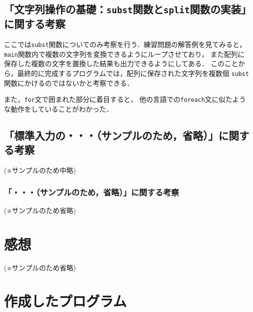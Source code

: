 \subsection{「文字列操作の基礎：\texttt{subst}関数と\texttt{split}関数の実装」に関する考察}

ここでは\verb|subst|関数についてのみ考察を行う．練習問題の解答例を見てみると，
\verb|main|関数内で複数の文字列を変換できるようにループさせており，
また配列に保存した複数の文字を置換した結果も出力できるようにしてある．
このことから，最終的に完成するプログラムでは，配列に保存された文字列を複数個
\verb|subst|関数にかけるのではないかと考察できる．

また，\verb|for|文で囲まれた部分に着目すると，
他の言語での\verb|foreach|文に似たような動作をしていることがわかった．

\subsection{「標準入力の・・・（\textbf{サンプルのため，省略}）」に関する考察}

(※サンプルのため中略)

\subsubsection{「・・・（\textbf{サンプルのため，省略}）」に関する考察}

(※サンプルのため省略)



\section{感想} \label{sec:6}

(※サンプルのため省略)

\section{作成したプログラム} \label{sec:7}

